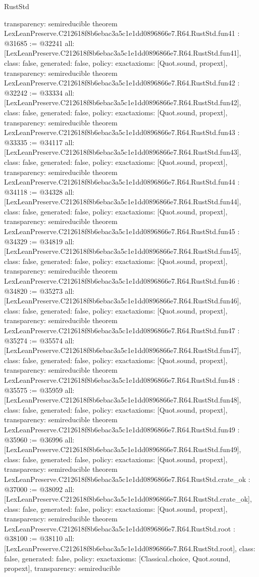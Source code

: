 \begin{lexlean}{RustStd}
\begin{coremodule}
{  transparency: semireducible
}
theorem LexLeanPreserve.C212618f8b6ebac3a5c1e1dd0896866e7.R64.RustStd.fun41 : @31685 := @32241 {
  all: [LexLeanPreserve.C212618f8b6ebac3a5c1e1dd0896866e7.R64.RustStd.fun41],
  class: false,
  generated: false,
  policy: exact{axioms: [Quot.sound, propext]},
  transparency: semireducible
}
theorem LexLeanPreserve.C212618f8b6ebac3a5c1e1dd0896866e7.R64.RustStd.fun42 : @32242 := @33334 {
  all: [LexLeanPreserve.C212618f8b6ebac3a5c1e1dd0896866e7.R64.RustStd.fun42],
  class: false,
  generated: false,
  policy: exact{axioms: [Quot.sound, propext]},
  transparency: semireducible
}
theorem LexLeanPreserve.C212618f8b6ebac3a5c1e1dd0896866e7.R64.RustStd.fun43 : @33335 := @34117 {
  all: [LexLeanPreserve.C212618f8b6ebac3a5c1e1dd0896866e7.R64.RustStd.fun43],
  class: false,
  generated: false,
  policy: exact{axioms: [Quot.sound, propext]},
  transparency: semireducible
}
theorem LexLeanPreserve.C212618f8b6ebac3a5c1e1dd0896866e7.R64.RustStd.fun44 : @34118 := @34328 {
  all: [LexLeanPreserve.C212618f8b6ebac3a5c1e1dd0896866e7.R64.RustStd.fun44],
  class: false,
  generated: false,
  policy: exact{axioms: [Quot.sound, propext]},
  transparency: semireducible
}
theorem LexLeanPreserve.C212618f8b6ebac3a5c1e1dd0896866e7.R64.RustStd.fun45 : @34329 := @34819 {
  all: [LexLeanPreserve.C212618f8b6ebac3a5c1e1dd0896866e7.R64.RustStd.fun45],
  class: false,
  generated: false,
  policy: exact{axioms: [Quot.sound, propext]},
  transparency: semireducible
}
theorem LexLeanPreserve.C212618f8b6ebac3a5c1e1dd0896866e7.R64.RustStd.fun46 : @34820 := @35273 {
  all: [LexLeanPreserve.C212618f8b6ebac3a5c1e1dd0896866e7.R64.RustStd.fun46],
  class: false,
  generated: false,
  policy: exact{axioms: [Quot.sound, propext]},
  transparency: semireducible
}
theorem LexLeanPreserve.C212618f8b6ebac3a5c1e1dd0896866e7.R64.RustStd.fun47 : @35274 := @35574 {
  all: [LexLeanPreserve.C212618f8b6ebac3a5c1e1dd0896866e7.R64.RustStd.fun47],
  class: false,
  generated: false,
  policy: exact{axioms: [Quot.sound, propext]},
  transparency: semireducible
}
theorem LexLeanPreserve.C212618f8b6ebac3a5c1e1dd0896866e7.R64.RustStd.fun48 : @35575 := @35959 {
  all: [LexLeanPreserve.C212618f8b6ebac3a5c1e1dd0896866e7.R64.RustStd.fun48],
  class: false,
  generated: false,
  policy: exact{axioms: [Quot.sound, propext]},
  transparency: semireducible
}
theorem LexLeanPreserve.C212618f8b6ebac3a5c1e1dd0896866e7.R64.RustStd.fun49 : @35960 := @36996 {
  all: [LexLeanPreserve.C212618f8b6ebac3a5c1e1dd0896866e7.R64.RustStd.fun49],
  class: false,
  generated: false,
  policy: exact{axioms: [Quot.sound, propext]},
  transparency: semireducible
}
theorem LexLeanPreserve.C212618f8b6ebac3a5c1e1dd0896866e7.R64.RustStd.crate_ok : @37000 := @38092 {
  all: [LexLeanPreserve.C212618f8b6ebac3a5c1e1dd0896866e7.R64.RustStd.crate_ok],
  class: false,
  generated: false,
  policy: exact{axioms: [Quot.sound, propext]},
  transparency: semireducible
}
theorem LexLeanPreserve.C212618f8b6ebac3a5c1e1dd0896866e7.R64.RustStd.root : @38100 := @38110 {
  all: [LexLeanPreserve.C212618f8b6ebac3a5c1e1dd0896866e7.R64.RustStd.root],
  class: false,
  generated: false,
  policy: exact{axioms: [Classical.choice, Quot.sound, propext]},
  transparency: semireducible
}


\end{coremodule}
\end{lexlean}
